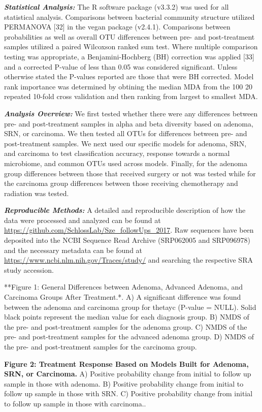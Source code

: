 \documentclass[12pt,]{article}
\begin{document}
\textbf{\emph{Statistical Analysis:}} The R software package (v3.3.2)
was used for all statistical analysis. Comparisons between bacterial
community structure utilized PERMANOVA {[}32{]} in the vegan package
(v2.4.1). Comparisons between probabilities as well as overall OTU
differences between pre- and post-treatment samples utilized a paired
Wilcoxson ranked sum test. Where multiple comparison testing was
appropriate, a Benjamini-Hochberg (BH) correction was applied {[}33{]}
and a corrected P-value of less than 0.05 was considered significant.
Unless otherwise stated the P-values reported are those that were BH
corrected. Model rank importance was determined by obtining the median
MDA from the 100 20 repeated 10-fold cross validation and then ranking
from largest to smallest MDA.

\textbf{\emph{Analysis Overview:}} We first tested whether there were
any differences between pre- and post-treatment samples in alpha and
beta diversity based on adenoma, SRN, or carcinoma. We then tested all
OTUs for differences between pre- and post-treatment samples. We next
used our specific models for adenoma, SRN, and carcinoma to test
classification accuracy, response towards a normal microbiome, and
common OTUs used across models. Finally, for the adenoma group
differences between those that received surgery or not was tested while
for the carcinoma group differences between those receiving chemotherapy
and radiation was tested.

\textbf{\emph{Reproducible Methods:}} A detailed and reproducible
description of how the data were processed and analyzed can be found at
\url{https://github.com/SchlossLab/Sze_followUps_2017}. Raw sequences
have been deposited into the NCBI Sequence Read Archive (SRP062005 and
SRP096978) and the necessary metadata can be found at
\url{https://www.ncbi.nlm.nih.gov/Traces/study/} and searching the
respective SRA study accession.

\newpage

**Figure 1: General Differences between Adenoma, Advanced Adenoma, and
Carcinoma Groups After Treatment.*. A) A significant difference was
found between the adenoma and carcinoma group for thetayc (P-value =
NULL). Solid black points represent the median value for each diagnosis
group. B) NMDS of the pre- and post-treatment samples for the adenoma
group. C) NMDS of the pre- and post-treatment samples for the advanced
adenoma group. D) NMDS of the pre- and post-treatment samples for the
carcinoma group.

\textbf{Figure 2: Treatment Response Based on Models Built for Adenoma,
SRN, or Carcinoma.} A) Positive probability change from initial to
follow up sample in those with adenoma. B) Positive probability change
from initial to follow up sample in those with SRN. C) Positive
probability change from initial to follow up sample in those with
carcinoma..
\end{document}
